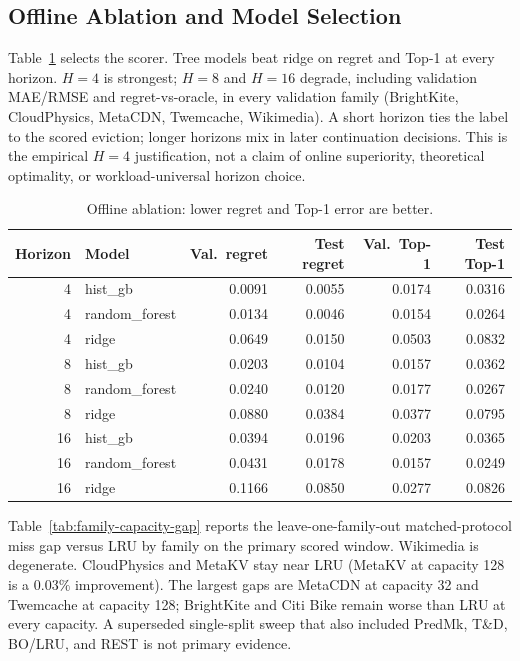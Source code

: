 \documentclass[preprint,12pt]{elsarticle}
\begin{document}
\subsection{Offline Ablation and Model Selection}
\label{subsec:main_results}

Table~\ref{tab:evict-value-ablation} selects the scorer. Tree models beat ridge on regret and Top-1 at every horizon. $H=4$ is strongest; $H=8$ and $H=16$ degrade, including validation MAE/RMSE and regret-vs-oracle, in every validation family (BrightKite, CloudPhysics, MetaCDN, Twemcache, Wikimedia). A short horizon ties the label to the scored eviction; longer horizons mix in later continuation decisions. This is the empirical $H=4$ justification, not a claim of online superiority, theoretical optimality, or workload-universal horizon choice.

\begin{table}[!htbp]
\centering
\caption{Offline ablation: lower regret and Top-1 error are better.}
\label{tab:evict-value-ablation}
\renewcommand{\arraystretch}{1.15}
\small
\setlength{\tabcolsep}{5pt}
\begin{tabular}{r l r r r r}
\toprule
Horizon & Model & Val.\ regret & Test regret & Val.\ Top-1 & Test Top-1 \\
\midrule
4  & hist\_gb       & 0.0091 & 0.0055 & 0.0174 & 0.0316 \\
4  & random\_forest & 0.0134 & 0.0046 & 0.0154 & 0.0264 \\
4  & ridge          & 0.0649 & 0.0150 & 0.0503 & 0.0832 \\
\midrule
8  & hist\_gb       & 0.0203 & 0.0104 & 0.0157 & 0.0362 \\
8  & random\_forest & 0.0240 & 0.0120 & 0.0177 & 0.0267 \\
8  & ridge          & 0.0880 & 0.0384 & 0.0377 & 0.0795 \\
\midrule
16 & hist\_gb       & 0.0394 & 0.0196 & 0.0203 & 0.0365 \\
16 & random\_forest & 0.0431 & 0.0178 & 0.0157 & 0.0249 \\
16 & ridge          & 0.1166 & 0.0850 & 0.0277 & 0.0826 \\
\bottomrule
\end{tabular}
\end{table}

Table~\ref{tab:family-capacity-gap} reports the leave-one-family-out matched-protocol miss gap versus LRU by family on the primary scored window. Wikimedia is degenerate. CloudPhysics and MetaKV stay near LRU (MetaKV at capacity 128 is a $0.03\%$ improvement). The largest gaps are MetaCDN at capacity 32 and Twemcache at capacity 128; BrightKite and Citi Bike remain worse than LRU at every capacity. A superseded single-split sweep that also included PredMk, T\&D, BO/LRU, and REST is not primary evidence.
\end{document}
